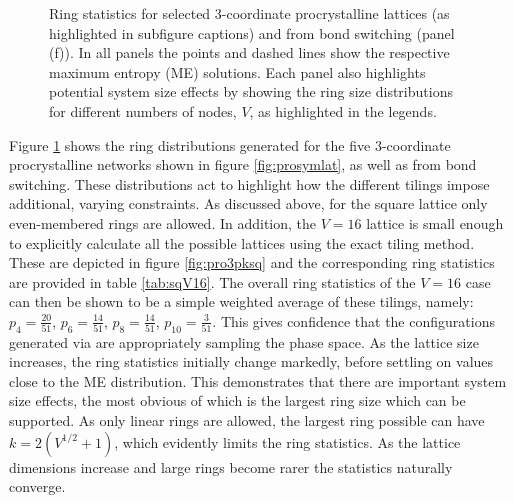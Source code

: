 \begin{figure}[btp]
     \caption{Ring statistics for selected 3\--coordinate procrystalline lattices (as highlighted in subfigure captions) and from bond switching (panel (f)). In  all  panels  the  points  and  dashed  lines show the respective maximum entropy (ME) solutions.  Each panel also highlights potential system size effects by showing the ring size distributions for different numbers of nodes, $V$, as highlighted in the legends.}
     \label{fig:pro3pk}
\end{figure}

Figure \ref{fig:pro3pk} shows the ring distributions generated for the five 3\--coordinate procrystalline networks shown in figure \ref{fig:prosymlat}, as well as from bond switching.
These distributions act to highlight how the different tilings impose additional, varying constraints.
As discussed above, for the square lattice only even\--membered rings are allowed.
In addition, the $V=16$ lattice is small enough to explicitly calculate all the possible lattices using the exact tiling method.
These are depicted in figure \ref{fig:pro3pksq} and the corresponding ring statistics are provided in table \ref{tab:sqV16}.
The overall ring statistics of the $V=16$ case can then be shown to be a simple weighted average of these tilings, namely: $p_4=\frac{20}{51}$, $p_6=\frac{14}{51}$, $p_8=\frac{14}{51}$, $p_{10}=\frac{3}{51}$.
This gives confidence that the configurations generated via \mc{} are appropriately sampling the phase space.
As the lattice size increases, the ring statistics initially change markedly, before settling on values close to the ME distribution.
This demonstrates that there are important system size effects, the most obvious of which is the largest ring size which can be supported.
As only linear rings are allowed, the largest ring possible can have $k=2\left(V^{1/2}+1\right)$, which evidently limits the ring statistics.
As the lattice dimensions increase and large rings become rarer the statistics naturally converge.


